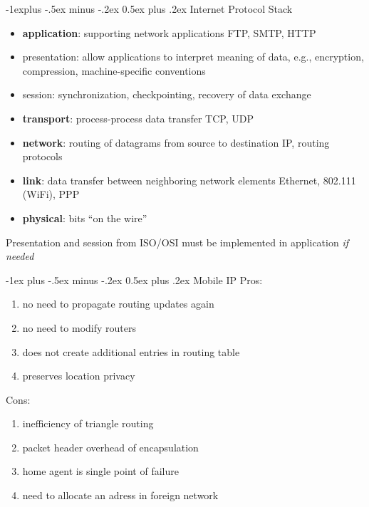 \documentclass[dvipdfmx,a4paper,10pt,landscape]{article}
\makeatletter
\renewcommand{\section}{\@startsection{section}{1}{0mm}%
                                {-1ex plus -.5ex minus -.2ex}%
                                {0.5ex plus .2ex}%
                                {\normalfont\large\bfseries}}
\renewcommand{\subsection}{\@startsection{subsection}{2}{0mm}%
                                {-1explus -.5ex minus -.2ex}%
                                {0.5ex plus .2ex}%
                                {\normalfont\normalsize\bfseries}}
\makeatother
\begin{document}
\begin{multicols}{3}
    \subsection{Internet Protocol Stack}
    \begin{itemize}
        \item \textbf{application}: supporting network applications
              FTP, SMTP, HTTP
        \item presentation: allow applications to
              interpret meaning of data, e.g., encryption,
              compression, machine-specific
              conventions
        \item session: synchronization, checkpointing,
              recovery of data exchange
        \item \textbf{transport}: process-process data transfer
              TCP, UDP
        \item \textbf{network}: routing of datagrams from source to
              destination
              IP, routing protocols
        \item \textbf{link}: data transfer between neighboring
              network elements
              Ethernet, 802.111 (WiFi), PPP
        \item \textbf{physical}: bits ``on the wire''
    \end{itemize}
    Presentation and session from ISO/OSI must be implemented in application \textit{if needed}

    \section{Mobile IP}
    Pros:
    \begin{enumerate}
        \item no need to propagate routing updates again
        \item no need to modify routers
        \item does not create additional entries in routing table
        \item preserves location privacy
    \end{enumerate}
    Cons:
    \begin{enumerate}
        \item inefficiency of triangle routing
        \item packet header overhead of encapsulation
        \item home agent is single point of failure
        \item need to allocate an adress in foreign network
    \end{enumerate}


\end{multicols}
\end{document}
